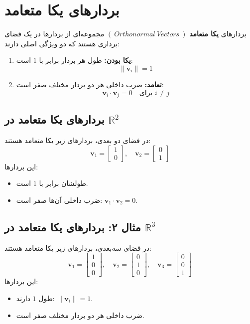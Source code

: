 \section{بردارهای یکا متعامد}
\begin{definition}
	
	بردارهای
	\textbf{یکا متعامد}
	$(~Orthonormal ~Vectors~)$  
	مجموعه‌ای از بردارها در یک فضای برداری هستند که دو ویژگی اصلی دارند:
	\begin{enumerate}
		\item \textbf{یکا بودن:} طول هر بردار برابر با \(1\) است:
		\[
		\|\mathbf{v}_i\| = 1
		\]
		\item \textbf{تعامد:} ضرب داخلی هر دو بردار مختلف صفر است:
		\[
		\mathbf{v}_i \cdot \mathbf{v}_j = 0 \quad \text{برای } i \neq j
		\]
	\end{enumerate}
\end{definition}
\begin{example}
	\subsection*{ بردارهای یکا متعامد در \(\mathbb{R}^2\)}
	در فضای دو بعدی، بردارهای زیر یکا متعامد هستند:
	\[
	\mathbf{v}_1 = \begin{bmatrix}
		1 \\
		0
	\end{bmatrix}, \quad
	\mathbf{v}_2 = \begin{bmatrix}
		0 \\
		1
	\end{bmatrix}
	\]
	این بردارها:
	\begin{itemize}
		\item طولشان برابر با \(1\) است.
		\item ضرب داخلی آن‌ها صفر است: \( \mathbf{v}_1 \cdot \mathbf{v}_2 = 0 \).
	\end{itemize}
\end{example}
\begin{example}
	\subsection*{مثال ۲: بردارهای یکا متعامد در \(\mathbb{R}^3\)}
	در فضای سه‌بعدی، بردارهای زیر یکا متعامد هستند:
	\[
	\mathbf{v}_1 = \begin{bmatrix}
		1 \\
		0 \\
		0
	\end{bmatrix}, \quad
	\mathbf{v}_2 = \begin{bmatrix}
		0 \\
		1 \\
		0
	\end{bmatrix}, \quad
	\mathbf{v}_3 = \begin{bmatrix}
		0 \\
		0 \\
		1
	\end{bmatrix}
	\]
	این بردارها:
	\begin{itemize}
		\item طول \(1\) دارند: \( \|\mathbf{v}_i\| = 1 \).
		\item ضرب داخلی هر دو بردار مختلف صفر است.
	\end{itemize}
\end{example}
